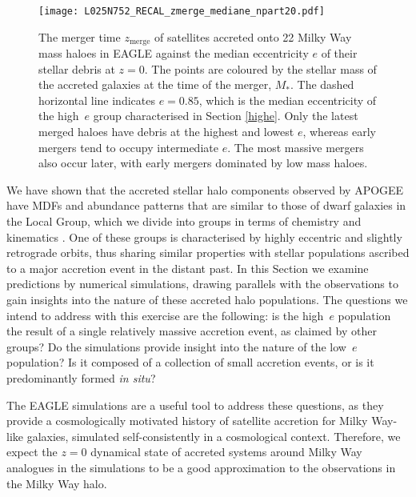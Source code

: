 \begin{figure}
\texttt{[image: L025N752\_RECAL\_zmerge\_mediane\_npart20.pdf]}
\caption{\label{fig:eagle} The merger time $z_\mathrm{merge}$ of
satellites accreted onto 22 Milky Way mass haloes in EAGLE against the
median eccentricity $e$ of their stellar debris at $z=0$. The points
are coloured by the stellar mass of the accreted galaxies at the
time of the merger, $M_*$. The dashed horizontal line indicates $e = 0.85$, which
is the median eccentricity of the high~$e$ group characterised in
Section \ref{highe}. Only the latest merged haloes have debris at
the highest and lowest $e$, whereas early mergers tend to occupy
intermediate $e$. The most massive mergers also occur later, with
early mergers dominated by low mass haloes.}
\end{figure}

We have shown that the accreted stellar halo components observed
by APOGEE \citep[characterised by][]{2018ApJ...852...49H} have MDFs
and abundance patterns that are similar to those of dwarf galaxies
in the Local Group, which we divide into groups in terms of chemistry
and kinematics \citep[see also][]{2018ApJ...852...49H}. One
of these groups is characterised by highly eccentric and slightly
retrograde orbits, thus sharing similar properties with stellar
populations ascribed to a major accretion event in the distant past.
In this Section we examine predictions by numerical simulations,
drawing parallels with the observations to gain insights into the
nature of these accreted halo populations.  The questions we intend
to address with this exercise are the following: is the high~$e$
population the result of a single relatively massive accretion
event, as claimed by other groups?  Do the simulations provide
insight into the nature of the low~$e$ population? Is it composed
of a collection of small accretion events, or is it predominantly
formed {\it in situ}?

The EAGLE simulations are a useful  tool to address these
questions, as they provide a  cosmologically motivated history of
satellite accretion for Milky Way-like galaxies, simulated
self-consistently in a cosmological context.  Therefore,  we
expect the  $z=0$ dynamical state of accreted systems around Milky Way analogues in the simulations to
be a good approximation to the observations in the Milky Way halo.

